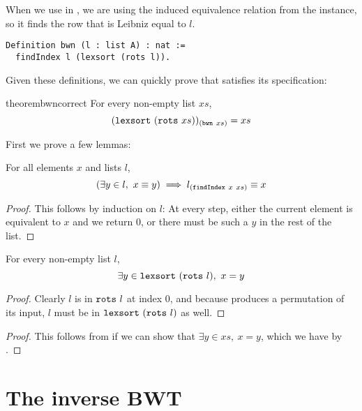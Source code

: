 \documentclass[sigplan,10pt,anonymous,review]{thesis}
\begin{document}
When we use  in , we are using the
induced equivalence relation from the  instance, so it
finds the row that is Leibniz equal to $l$.
\begin{lstlisting}
Definition bwn (l : list A) : nat :=
  findIndex l (lexsort (rots l)).
\end{lstlisting}

Given these definitions, we can quickly prove that 
satisfies its specification:
\begin{restatable*}{theorem}{bwncorrect}
  For every non-empty list $xs$,
  \begin{equation*}
    (\texttt{\textup{lexsort}}~(\texttt{\textup{rots}}~xs))_{(\texttt{\textup{bwn}}~xs)} = xs
  \end{equation*}
\end{restatable*}

First we prove a few lemmas:
\begin{lemma}
  For all elements $x$ and lists $l$,
  \begin{equation*}
    (\exists y \in l,~x \equiv y) \implies l_{(\texttt{\textup{findIndex}}~x~xs)} \equiv x
  \end{equation*}
\end{lemma}
\begin{proof}
  This follows by induction on $l$: At every step, either the
  current element is equivalent to $x$ and we return $0$, or there
  must be such a $y$ in the rest of the list.
\end{proof}

\begin{lemma}
  For every non-empty list $l$,
  \begin{equation*}
    \exists y \in \texttt{\textup{lexsort}}~(\texttt{\textup{rots}}~l),~x = y
  \end{equation*}
\end{lemma}
\begin{proof}
  Clearly $l$ is in $\texttt{\textup{rots}}~l$ at index 0, and because
   produces a permutation of its input, $l$ must be
  in $\texttt{\textup{lexsort}}~(\texttt{\textup{rots}}~l)$ as well.
\end{proof}

\bwncorrect
\begin{proof}
  This follows from  if we can show that
  $\exists y \in xs,~x = y$, which we have by .
\end{proof}

\section{The inverse BWT}
\label{sec:inverse_BWT}
\end{document}
